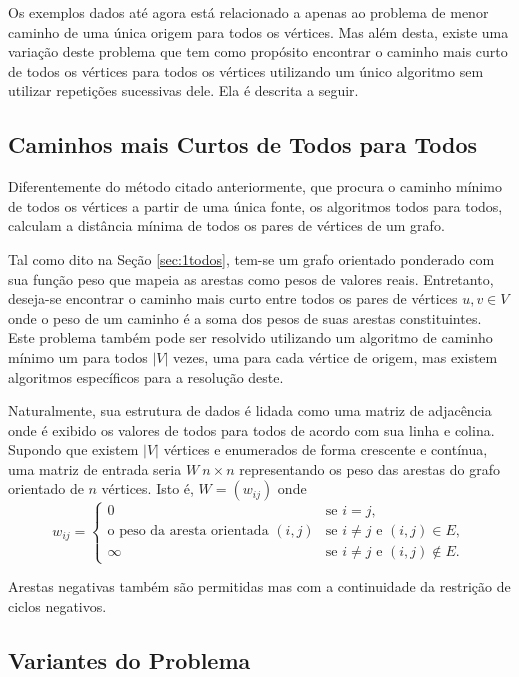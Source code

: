 \documentclass[12pt]{article}
\begin{document}
Os exemplos dados até agora está relacionado a apenas ao problema de menor caminho de uma única origem para todos os vértices. Mas além desta, existe uma variação deste problema que tem como propósito encontrar o caminho mais curto de todos os vértices para todos os vértices utilizando um único algoritmo sem utilizar repetições sucessivas dele. Ela é descrita a seguir.

\subsection{Caminhos mais Curtos de Todos para Todos}

Diferentemente do método citado anteriormente, que procura o caminho mínimo de todos os vértices a partir de uma única fonte, os algoritmos todos para todos, calculam a distância mínima de todos os pares de vértices de um grafo.

Tal como dito na Seção \ref{sec:1todos}, tem-se um grafo orientado ponderado com sua função peso que mapeia as arestas como pesos de valores reais. Entretanto, deseja-se encontrar o caminho mais curto entre todos os pares de vértices $u,v \in V$ onde o peso de um caminho é a soma dos pesos de suas arestas constituintes. Este problema também pode ser resolvido utilizando um algoritmo de caminho mínimo um para todos $|V|$ vezes, uma para cada vértice de origem, mas existem algoritmos específicos para a resolução deste.

Naturalmente, sua estrutura de dados é lidada como uma matriz de adjacência onde é exibido os valores de todos para todos de acordo com sua linha e colina. Supondo que existem $|V|$ vértices e enumerados de forma crescente e contínua, uma matriz de entrada seria $W\ n \times n$ representando os peso das arestas do grafo orientado de $n$ vértices. Isto é, $W = (w_{ij})$ onde 
$$
w_{ij} = 
	\begin{cases}
    	0 & \mbox{se } i = j, \\
        \mbox{o peso da aresta orientada } (i, j) & \mbox{se } i \neq j \mbox{ e } (i, j) \in E, \\
        \infty & \mbox{se } i \neq j \mbox{ e } (i, j) \notin E.
    \end{cases}
$$

Arestas negativas também são permitidas mas com a continuidade da restrição de ciclos negativos. 


\subsection{Variantes do Problema}
\end{document}
